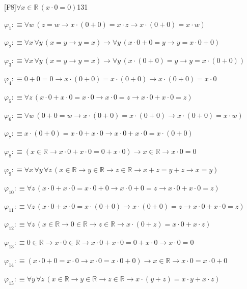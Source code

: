 \begin{fullproof}{[F8]}{$\forall x \in \mathbb{R}\,(x \cdot 0 = 0)$}{131}
\begin{abbrevlist}
\item $\varphi_{1} :\equiv \forall w\,(z = w \to x \cdot (0 + 0) = x \cdot z \to x \cdot (0 + 0) = x \cdot w)$
\item $\varphi_{2} :\equiv \forall x\,\forall y\,(x = y \to y = x) \to \forall y\,(x \cdot 0 + 0 = y \to y = x \cdot 0 + 0)$
\item $\varphi_{3} :\equiv \forall x\,\forall y\,(x = y \to y = x) \to \forall y\,(x \cdot (0 + 0) = y \to y = x \cdot (0 + 0))$
\item $\varphi_{4} :\equiv 0 + 0 = 0 \to x \cdot (0 + 0) = x \cdot (0 + 0) \to x \cdot (0 + 0) = x \cdot 0$
\item $\varphi_{5} :\equiv \forall z\,(x \cdot 0 + x \cdot 0 = x \cdot 0 \to x \cdot 0 = z \to x \cdot 0 + x \cdot 0 = z)$
\item $\varphi_{6} :\equiv \forall w\,(0 + 0 = w \to x \cdot (0 + 0) = x \cdot (0 + 0) \to x \cdot (0 + 0) = x \cdot w)$
\item $\varphi_{7} :\equiv x \cdot (0 + 0) = x \cdot 0 + x \cdot 0 \to x \cdot 0 + x \cdot 0 = x \cdot (0 + 0)$
\item $\varphi_{8} :\equiv (x \in \mathbb{R} \to x \cdot 0 + x \cdot 0 = 0 + x \cdot 0) \to x \in \mathbb{R} \to x \cdot 0 = 0$
\item $\varphi_{9} :\equiv \forall x\,\forall y\,\forall z\,(x \in \mathbb{R} \to y \in \mathbb{R} \to z \in \mathbb{R} \to x + z = y + z \to x = y)$
\item $\varphi_{10} :\equiv \forall z\,(x \cdot 0 + x \cdot 0 = x \cdot 0 + 0 \to x \cdot 0 + 0 = z \to x \cdot 0 + x \cdot 0 = z)$
\item $\varphi_{11} :\equiv \forall z\,(x \cdot 0 + x \cdot 0 = x \cdot (0 + 0) \to x \cdot (0 + 0) = z \to x \cdot 0 + x \cdot 0 = z)$
\item $\varphi_{12} :\equiv \forall z\,(x \in \mathbb{R} \to 0 \in \mathbb{R} \to z \in \mathbb{R} \to x \cdot (0 + z) = x \cdot 0 + x \cdot z)$
\item $\varphi_{13} :\equiv 0 \in \mathbb{R} \to x \cdot 0 \in \mathbb{R} \to x \cdot 0 + x \cdot 0 = 0 + x \cdot 0 \to x \cdot 0 = 0$
\item $\varphi_{14} :\equiv (x \cdot 0 + 0 = x \cdot 0 \to x \cdot 0 = x \cdot 0 + 0) \to x \in \mathbb{R} \to x \cdot 0 = x \cdot 0 + 0$
\item $\varphi_{15} :\equiv \forall y\,\forall z\,(x \in \mathbb{R} \to y \in \mathbb{R} \to z \in \mathbb{R} \to x \cdot (y + z) = x \cdot y + x \cdot z)$

\end{abbrevlist}
\end{fullproof}
